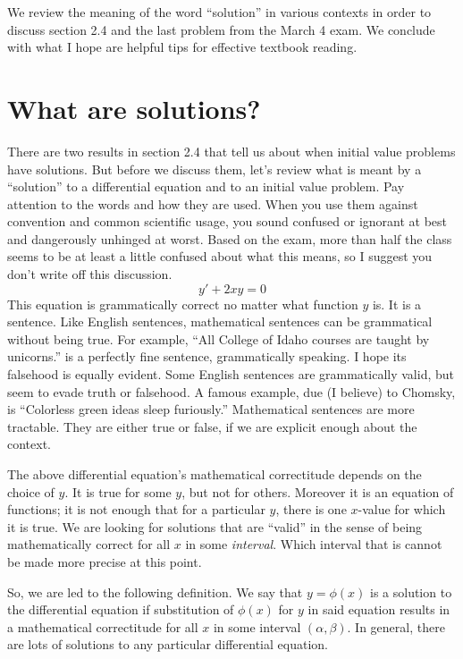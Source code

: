 \documentclass[twocolumn,12pt]{article}
\date{March 6, 2013 (Wed)}
\begin{document}
\makeheader

\begin{summary}
We review the meaning of the word ``solution'' in various contexts in order to discuss section 2.4 and the last problem from the March 4 exam. We conclude with what I hope are helpful tips for effective textbook reading.
\end{summary}

\section{What are solutions?}
There are two results in section 2.4 that tell us about when initial value problems have solutions. But before we discuss them, let's review what is meant by a ``solution'' to a differential equation and to an initial value problem. Pay attention to the words and how they are used. When you use them against convention and common scientific usage, you sound confused or ignorant at best and dangerously unhinged at worst. Based on the exam, more than half the class seems to be at least a little confused about what this means, so I suggest you don't write off this discussion.
\[
  y' + 2xy = 0
\]
This equation is grammatically correct no matter what function $y$ is. It is a sentence. Like English sentences, mathematical sentences can be grammatical without being true. For example, ``All College of Idaho courses are taught by unicorns.'' is a perfectly fine sentence, grammatically speaking. I hope its falsehood is equally evident. Some English sentences are grammatically valid, but seem to evade truth or falsehood. A famous example, due (I believe) to Chomsky, is ``Colorless green ideas sleep furiously.'' Mathematical sentences are more tractable. They are either true or false, if we are explicit enough about the context.

The above differential equation's mathematical correctitude depends on the choice of $y$. It is true for some $y$, but not for others. Moreover it is an equation of functions; it is not enough that for a particular $y$, there is one $x$-value for which it is true. We are looking for solutions that are ``valid'' in the sense of being mathematically correct for all $x$ in some \emph{interval}. Which interval that is cannot be made more precise at this point.

So, we are led to the following definition. We say that $y = \phi(x)$ is a solution to the differential equation if substitution of $\phi(x)$ for $y$ in said equation results in a mathematical correctitude for all $x$ in some interval $(\alpha, \beta)$. In general, there are lots of solutions to any particular differential equation.
\end{document}
